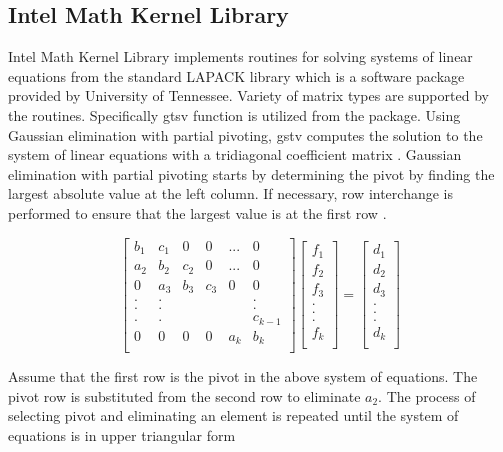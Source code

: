 \documentclass[12pt, oneside]{book}
\theoremstyle{plain}
\theoremstyle{definition}
\begin{document}
\subsection{Intel Math Kernel Library}
Intel Math Kernel Library implements routines for solving systems of linear equations from the standard LAPACK library  which is a software package provided by University of Tennessee. Variety of matrix types are supported by the routines. Specifically gtsv function is utilized from the package. Using Gaussian elimination with partial pivoting, gstv computes the solution to the system of linear equations with a tridiagonal coefficient matrix \cite{gtsv}.  Gaussian elimination with partial pivoting  starts by determining the pivot by finding the largest absolute  value at the left column. If necessary, row interchange is performed to ensure that the largest value is at the first row \cite{gtsvSource}.

$$
\begin{bmatrix}  
b_1 & c_1 & 0 & 0 & ... & 0 \\ 
a_2 & b_2 & c_2 & 0 & ... & 0 \\ 
0 & a_3 & b_3 & c_3 & 0 & 0 \\ 
. & . &  &  &  & . \\ 
. & . &  &  &  & . \\ 
. & . &  &  &  & c_{k-1} \\ 
0 & 0 & 0 & 0 & a_k & b_k \\ 
\end{bmatrix} \begin{bmatrix}  
f_1 \\ 
f_2 \\ 
f_3 \\ 
.\\ 
.\\ 
.\\ 
f_k \\ 
\end{bmatrix} = \begin{bmatrix} 
d_1 \\ 
d_2 \\ 
d_3 \\ 
.\\ 
.\\ 
.\\ 
d_k \\ 
\end{bmatrix}
$$

Assume that the first row is the pivot in the above system of equations. The pivot row is substituted from the second row to eliminate $a_2$. The process of selecting pivot and eliminating an element is repeated until the system of equations is in upper triangular form
\end{document}
